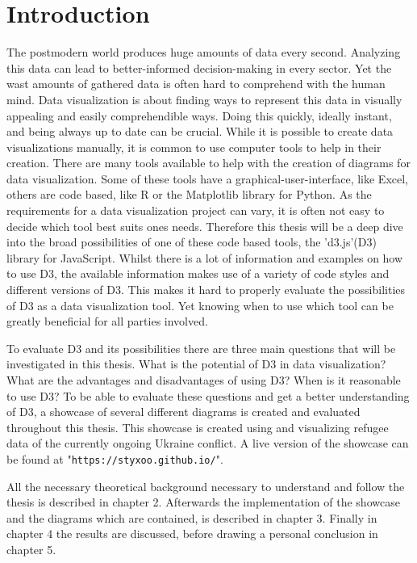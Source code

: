 \chapter{Introduction}


The postmodern world produces huge amounts of data every second. Analyzing this data can lead to better-informed decision-making in every sector. Yet the wast amounts of gathered data is often hard to comprehend with the human mind. Data visualization is about finding ways to represent this data in visually appealing and easily comprehendible ways\cite{sadiku2016data}. Doing this quickly, ideally instant, and being always up to date can be crucial. While it is possible to create data visualizations manually, it is common to use computer tools to help in their creation. There are many tools available to help with the creation of diagrams for data visualization. Some of these tools have a graphical-user-interface, like Excel\cite{excel}, others are code based, like R\cite{r} or the Matplotlib\cite{matplotlib} library for Python. As the requirements for a data visualization project can vary, it is often not easy to decide which tool best suits ones needs. Therefore this thesis will be a deep dive into the broad possibilities of one of these code based tools, the 'd3.js'(D3) library for JavaScript. Whilst there is a lot of information and examples on how to use D3, the available information makes use of a variety of code styles and different versions of D3. This makes it hard to properly evaluate the possibilities of D3 as a data visualization tool. Yet knowing when to use which tool can be greatly beneficial for all parties involved.

To evaluate D3 and its possibilities there are three main questions that will be investigated in this thesis. What is the potential of D3 in data visualization? What are the advantages and disadvantages of using D3? When is it reasonable to use D3? To be able to evaluate these questions and get a better understanding of D3, a showcase of several different diagrams is created and evaluated throughout this thesis. This showcase is created using and visualizing refugee data of the currently ongoing Ukraine conflict. A live version of the showcase can be found at "\texttt{https://styxoo.github.io/}".

All the necessary theoretical background necessary to understand and follow the thesis is described in chapter 2. Afterwards the implementation of the showcase and the diagrams which are contained, is described in chapter 3. Finally in chapter 4 the results are discussed, before drawing a personal conclusion in chapter 5.
